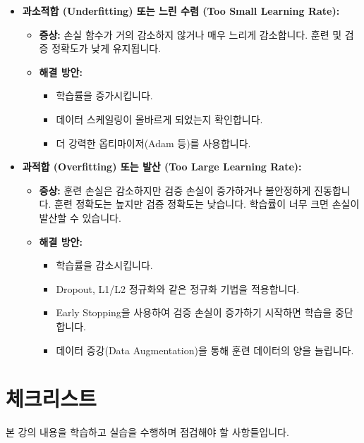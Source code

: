 \documentclass[11pt,a4paper]{book}
\theoremstyle{definition}
\begin{document}
\begin{itemize}
    \item \textbf{과소적합 (Underfitting) 또는 느린 수렴 (Too Small Learning Rate):}
    \begin{itemize}
        \item \textbf{증상:} 손실 함수가 거의 감소하지 않거나 매우 느리게 감소합니다. 훈련 및 검증 정확도가 낮게 유지됩니다.
        \item \textbf{해결 방안:}
        \begin{itemize}
            \item 학습률을 증가시킵니다.
            \item 데이터 스케일링이 올바르게 되었는지 확인합니다.
            \item 더 강력한 옵티마이저(Adam 등)를 사용합니다.
        \end{itemize}
    \end{itemize}
    \item \textbf{과적합 (Overfitting) 또는 발산 (Too Large Learning Rate):}
    \begin{itemize}
        \item \textbf{증상:} 훈련 손실은 감소하지만 검증 손실이 증가하거나 불안정하게 진동합니다. 훈련 정확도는 높지만 검증 정확도는 낮습니다. 학습률이 너무 크면 손실이 발산할 수 있습니다.
        \item \textbf{해결 방안:}
        \begin{itemize}
            \item 학습률을 감소시킵니다.
            \item Dropout, L1/L2 정규화와 같은 정규화 기법을 적용합니다.
            \item Early Stopping을 사용하여 검증 손실이 증가하기 시작하면 학습을 중단합니다.
            \item 데이터 증강(Data Augmentation)을 통해 훈련 데이터의 양을 늘립니다.
        \end{itemize}
    \end{itemize}
\end{itemize}


\section{체크리스트}
본 강의 내용을 학습하고 실습을 수행하며 점검해야 할 사항들입니다.
\end{document}
